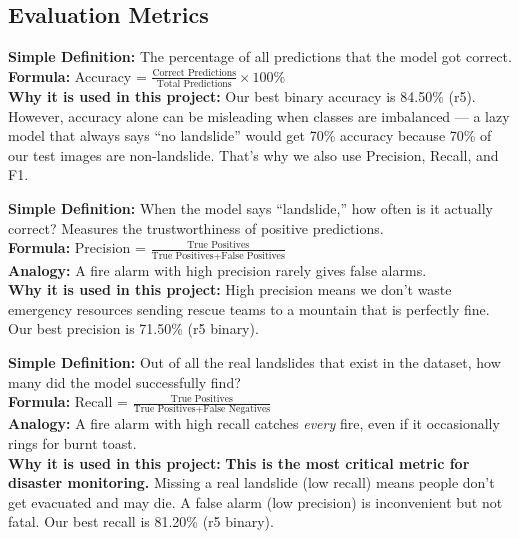 \documentclass[11pt]{article}
\begin{document}
\begin{description}[style=nextline, leftmargin=1.5cm]
\end{description}

\subsection{Evaluation Metrics}

\begin{description}[style=nextline, leftmargin=1.5cm]

    \item[\textbf{Accuracy}]
    \textbf{Simple Definition:} The percentage of all predictions that the model got correct.\\
    \textbf{Formula:} Accuracy = $\frac{\text{Correct Predictions}}{\text{Total Predictions}} \times 100\%$\\
    \textbf{Why it is used in this project:} Our best binary accuracy is 84.50\% (r5). However, accuracy alone can be misleading when classes are imbalanced --- a lazy model that always says ``no landslide'' would get 70\% accuracy because 70\% of our test images are non-landslide. That's why we also use Precision, Recall, and F1.

    \item[\textbf{Precision}]
    \textbf{Simple Definition:} When the model says ``landslide,'' how often is it actually correct? Measures the trustworthiness of positive predictions.\\
    \textbf{Formula:} Precision = $\frac{\text{True Positives}}{\text{True Positives} + \text{False Positives}}$\\
    \textbf{Analogy:} A fire alarm with high precision rarely gives false alarms.\\
    \textbf{Why it is used in this project:} High precision means we don't waste emergency resources sending rescue teams to a mountain that is perfectly fine. Our best precision is 71.50\% (r5 binary).

    \item[\textbf{Recall (Sensitivity)}]
    \textbf{Simple Definition:} Out of all the real landslides that exist in the dataset, how many did the model successfully find?\\
    \textbf{Formula:} Recall = $\frac{\text{True Positives}}{\text{True Positives} + \text{False Negatives}}$\\
    \textbf{Analogy:} A fire alarm with high recall catches \emph{every} fire, even if it occasionally rings for burnt toast.\\
    \textbf{Why it is used in this project:} \textbf{This is the most critical metric for disaster monitoring.} Missing a real landslide (low recall) means people don't get evacuated and may die. A false alarm (low precision) is inconvenient but not fatal. Our best recall is 81.20\% (r5 binary).


\end{description}
\end{document}
